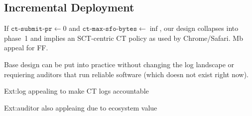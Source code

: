 \subsection{Incremental Deployment}
If $\texttt{ct-submit-pr} \gets 0$ and $\texttt{ct-max-sfo-bytes} \gets
\inf$, our design collapses into phase~1 and implies an SCT-centric CT policy
as used by Chrome/Safari.  Mb appeal for FF.

Base design can be put into practice without changing the log landscape or
requiering auditors that run reliable software (which doesn not exist right
now).

Ext:log appealing to make CT logs accountable

Ext:auditor also appleaing due to ecosystem value
